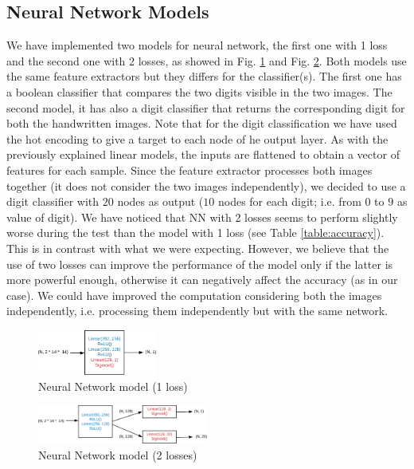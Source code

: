 \documentclass[journal, a4paper]{IEEEtran}
\begin{document}
\subsection{Neural Network Models}
\label{sec:nnmodel}
We have implemented two models for neural network, the first one with 1 loss and the second one with 2 losses, as showed in Fig. \ref{fig:nn1} and Fig. \ref{fig:nn2}. Both models use the same feature extractors but they differs for the classifier(s). The first one has a boolean classifier that compares the two digits visible in the two images. The second model, it has also a digit classifier that returns the corresponding digit for both the handwritten images. Note that for the digit classification we have used the hot encoding to give a target to each node of he output layer.
As with the previously explained linear models, the inputs are flattened to obtain a vector of features for each sample.
Since the feature extractor processes both images together (it does not consider the two images independently), we decided to use a digit classifier with $20$ nodes as output ($10$ nodes for each digit; i.e. from $0$ to $9$ as value of digit). We have noticed that NN with 2 losses seems to perform slightly worse during the test than the model with 1 loss (see Table \ref{table:accuracy}). This is in contrast with what we were expecting. However, we believe that the use of two losses can improve the performance of the model only if the latter is more powerful enough, otherwise it can negatively affect the accuracy (as in our case). We could have improved the computation considering both the images independently, i.e. processing them independently but with the same network.

\begin{figure}[!h]
    \centering
    \includegraphics[width=0.35\textwidth]{nn1.png}
    \caption{Neural Network model (1 loss)}
    \label{fig:nn1}
\end{figure}

\begin{figure}[!h]
    \centering
    \includegraphics[width=0.5\textwidth]{nn2.png}
    \caption{Neural Network model (2 losses)}
    \label{fig:nn2}
\end{figure}
\end{document}
